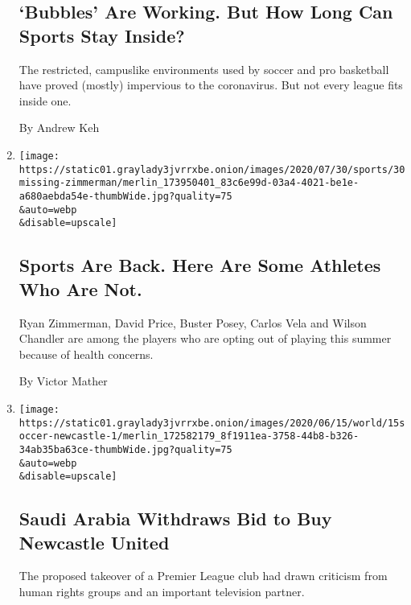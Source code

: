 \begin{enumerate}
  \hypertarget{bubbles-are-working-but-how-long-can-sports-stay-inside}{%
  \subsection{`Bubbles' Are Working. But How Long Can Sports Stay
  Inside?}\label{bubbles-are-working-but-how-long-can-sports-stay-inside}}

  The restricted, campuslike environments used by soccer and pro
  basketball have proved (mostly) impervious to the coronavirus. But not
  every league fits inside one.

  By Andrew Keh
\item
  \href{/2020/07/30/sports/players-opt-out.html}{}

  \texttt{[image: https://static01.graylady3jvrrxbe.onion/images/2020/07/30/sports/30missing-zimmerman/merlin\_173950401\_83c6e99d-03a4-4021-be1e-a680aebda54e-thumbWide.jpg?quality=75\\\&auto=webp\\\&disable=upscale]}

  \hypertarget{sports-are-back-here-are-some-athletes-who-are-not}{%
  \subsection{Sports Are Back. Here Are Some Athletes Who Are
  Not.}\label{sports-are-back-here-are-some-athletes-who-are-not}}

  Ryan Zimmerman, David Price, Buster Posey, Carlos Vela and Wilson
  Chandler are among the players who are opting out of playing this
  summer because of health concerns.

  By Victor Mather
\item
  \href{/2020/07/30/sports/soccer/saudi-arabia-newcastle-united.html}{}

  \texttt{[image: https://static01.graylady3jvrrxbe.onion/images/2020/06/15/world/15soccer-newcastle-1/merlin\_172582179\_8f1911ea-3758-44b8-b326-34ab35ba63ce-thumbWide.jpg?quality=75\\\&auto=webp\\\&disable=upscale]}

  \hypertarget{saudi-arabia-withdraws-bid-to-buy-newcastle-united}{%
  \subsection{Saudi Arabia Withdraws Bid to Buy Newcastle
  United}\label{saudi-arabia-withdraws-bid-to-buy-newcastle-united}}

  The proposed takeover of a Premier League club had drawn criticism
  from human rights groups and an important television partner.


\end{enumerate}

